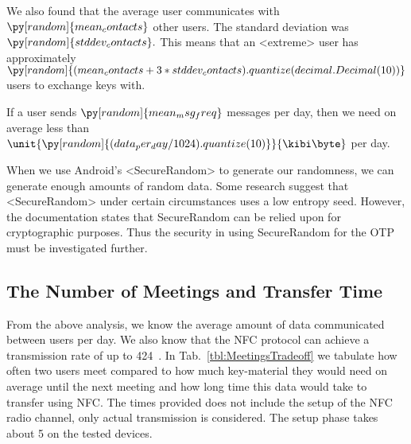 We also found that the average user communicates with
\(\py[random]{mean_contacts}\)
other users.
The standard deviation was
\(\py[random]{stddev_contacts}.\)
This means that an <extreme> user has approximately
\(\py[random]{(mean_contacts 
+ 3*stddev_contacts).quantize(decimal.Decimal(10))}\)
users to exchange keys with.

\reversemarginpar
{}
\reversemarginpar
If a user sends
\(\py[random]{mean_msg_freq}\)
messages per day, then we need on average less than
\(\unit{\py[random]{(data_per_day/1024).quantize( 10 )}}{\kibi\byte}\)
per day.

When we use Android's <SecureRandom> to generate our randomness, we can 
generate enough amounts of random data.
Some research \cite{AndroidLowEntropyMyth,JavaRandomness} suggest that 
<SecureRandom> under certain circumstances uses a low entropy seed.
However, the documentation states that SecureRandom can be relied upon for 
cryptographic purposes.
Thus the security in using SecureRandom for the \ac{OTP} must be investigated 
further.

\subsection{The Number of Meetings and Transfer Time}
\label{sec:Meetings}
From the above analysis, we know the average amount of data communicated 
between users per day.
We also know that the \ac{NFC} protocol can achieve a transmission rate of up 
to \unit{424}{\kilo\bit\per\second}~\cite{NFCController}.
In Tab.~\ref{tbl:MeetingsTradeoff} we tabulate how often two users meet 
compared to how much key-material they would need on average until the next 
meeting and how long time this data would take to transfer using \ac{NFC}.
The times provided does not include the setup of the \ac{NFC} radio channel, 
only actual transmission is considered. The setup phase takes about 
\unit{5}{\second} on the tested devices.

